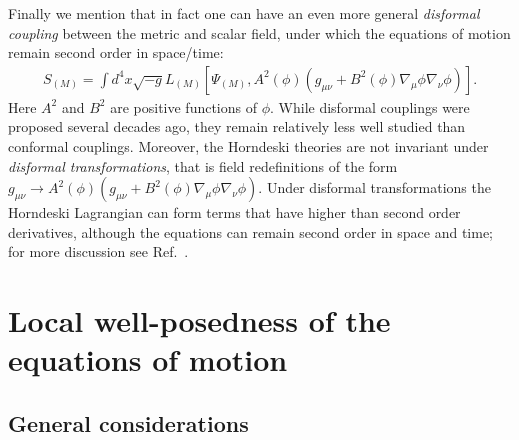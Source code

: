 \documentclass{ws-ijmpd}
\begin{document}
Finally we mention that in fact one can have an even more general
\emph{disformal coupling} between the metric and 
scalar field\cite{Bekenstein:1992pj}, under which the equations of
motion remain second order in space/time:
\begin{align}
   S_{(M)}
   =
   \int d^4x\sqrt{-g}L_{(M)}\left[
      \Psi_{(M)},A^2\left(\phi\right)
      \left(
         g_{\mu\nu}
         +
         B^2\left(\phi\right)\nabla_{\mu}\phi\nabla_{\nu}\phi
      \right)
   \right]
   .
\end{align}
Here $A^2$ and $B^2$ are positive functions of $\phi$.
While disformal couplings were proposed several decades 
ago\cite{Bekenstein:1992pj}, they remain relatively less well studied
than conformal couplings.
Moreover, the Horndeski theories are not invariant under \emph{disformal
transformations}, that is field redefinitions of the form 
$g_{\mu\nu}\to
      A^2\left(\phi\right)
      \left(
         g_{\mu\nu}
         +
         B^2\left(\phi\right)\nabla_{\mu}\phi\nabla_{\nu}\phi
      \right)$.
Under disformal transformations the Horndeski Lagrangian can form
terms that have higher than second order derivatives, although the
equations can remain second order in space and time; 
for more discussion see Ref.~.
\section{Local well-posedness of the equations of motion
\label{sec:local_well_posedness}
}
\subsection{General considerations\label{sec:general_considerations}}
	
\end{document}
